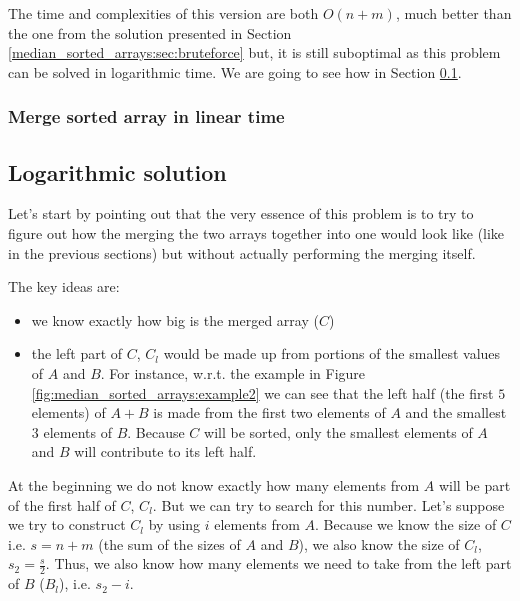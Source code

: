 

The time and complexities of this version are both $O(n+m)$, much better than the one from the solution presented in
Section \ref{median_sorted_arrays:sec:bruteforce} but, it is still suboptimal as this problem can be
solved in logarithmic time. We are going to see how in Section \ref{median_sorted_arrays:sec:log}.

\subsubsection{Merge sorted array in linear time}

\subsection{Logarithmic solution}
\label{median_sorted_arrays:sec:log}
Let's start by pointing out that the very essence of this problem is to try to figure out how the
merging the two arrays together into one would look like (like in the previous sections) but without
actually performing the merging itself.

The key ideas are:
\begin{itemize}
	\item we know exactly how big is the merged array ($C$)
	\item the left part of $C$, $C_l$ would be made up from portions of the smallest values of $A$
	and $B$. For instance, w.r.t. the example in Figure \ref{fig:median_sorted_arrays:example2} we
	can see that the left half (the first $5$ elements) of $A+B$ is made from the first two elements
	of $A$ and the smallest $3$ elements of $B$. Because $C$ will be sorted, only the smallest
	elements of $A$ and $B$ will contribute to its left half.
\end{itemize}

At the beginning we do not know exactly how many elements from $A$ will be part of the first half of
$C$, $C_l$. But we can try to search for this number. Let's suppose we try to construct $C_l$ by
using $i$ elements from $A$. Because we know the size of $C$ i.e. $s=n+m$ (the sum of the sizes of
$A$ and $B$), we also know the size of $C_l$, $s_2 = \frac{s}{2}$. Thus, we also know how many
elements we need to take from the left part of $B$ ($B_l$), i.e. $s_2 - i$.
